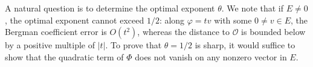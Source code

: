 \documentclass[11pt,reqno]{amsart}
\newcommand{\subsectionnotoc}[1]{%
  \par\addvspace{.5\baselineskip plus .7\baselineskip}%
  \noindent{\normalfont\bfseries #1.}\enspace\ignorespaces
}
\newtheorem{theorem}{Theorem}[section]
\theoremstyle{corollary}
\theoremstyle{conjecture}
\theoremstyle{assumption}
\theoremstyle{proposition}
\theoremstyle{remark}
\numberwithin{equation}{section}
\begin{document}
A natural question is to determine the optimal exponent $\theta$. We note that if $E\neq 0$, the optimal exponent cannot exceed $1/2$: along $\varphi=tv$ with some $0\neq v\in E$, the Bergman coefficient error is $O(t^2)$, whereas the distance to $\mathcal O$ is bounded below by a positive multiple of $|t|$. To prove that $\theta=1/2$ is sharp, it would suffice to show that the quadratic term of $\Phi$ does not vanish on any nonzero vector in $E$.






%





\end{document}

